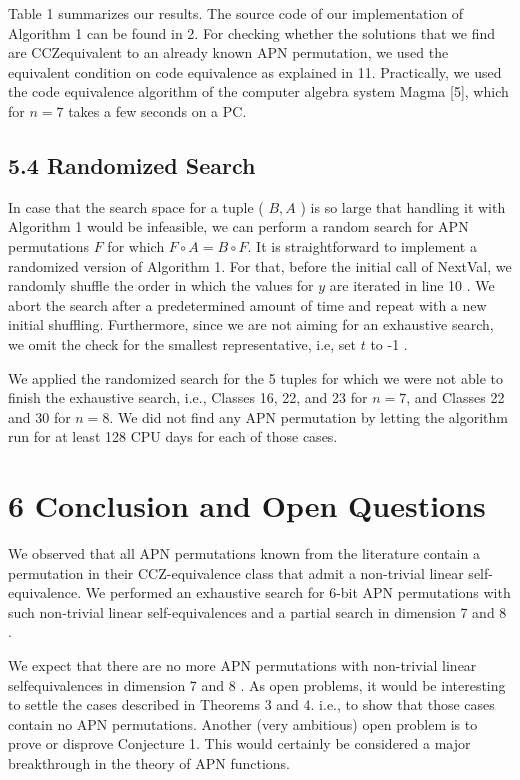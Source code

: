 \documentclass[10pt]{article}
\begin{document}
Table 1 summarizes our results. The source code of our implementation of Algorithm 1 can be found in 2. For checking whether the solutions that we find are CCZequivalent to an already known APN permutation, we used the equivalent condition on code equivalence as explained in 11. Practically, we used the code equivalence algorithm of the computer algebra system Magma [5], which for $n=7$ takes a few seconds on a PC.

\subsection*{5.4 Randomized Search}
In case that the search space for a tuple ( $B, A$ ) is so large that handling it with Algorithm 1 would be infeasible, we can perform a random search for APN permutations $F$ for which $F \circ A=B \circ F$. It is straightforward to implement a randomized version of Algorithm 1. For that, before the initial call of NextVal, we randomly shuffle the order in which the values for $y$ are iterated in line 10 . We abort the search after a predetermined amount of time and repeat with a new initial shuffling. Furthermore, since we are not aiming for an exhaustive search, we omit the check for the smallest representative, i.e, set $t$ to -1 .

We applied the randomized search for the 5 tuples for which we were not able to finish the exhaustive search, i.e., Classes 16, 22, and 23 for $n=7$, and Classes 22 and 30 for $n=8$. We did not find any APN permutation by letting the algorithm run for at least 128 CPU days for each of those cases.

\section*{6 Conclusion and Open Questions}
We observed that all APN permutations known from the literature contain a permutation in their CCZ-equivalence class that admit a non-trivial linear self-equivalence. We performed an exhaustive search for 6-bit APN permutations with such non-trivial linear self-equivalences and a partial search in dimension 7 and 8 .

We expect that there are no more APN permutations with non-trivial linear selfequivalences in dimension 7 and 8 . As open problems, it would be interesting to settle the cases described in Theorems 3 and 4. i.e., to show that those cases contain no APN permutations. Another (very ambitious) open problem is to prove or disprove Conjecture 1. This would certainly be considered a major breakthrough in the theory of APN functions.
\end{document}
